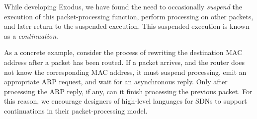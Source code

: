 While developing Exodus, we have found the need to occasionally \emph{suspend}
the execution of this packet-processing function, perform processing on other packets,
and later return to the suspended execution. This suspended execution is known as
a \emph{continuation}.

As a concrete example, consider the process of rewriting the destination MAC address
after a packet has been routed. If a packet arrives, and the router does not know the
corresponding MAC address, it must suspend processing, emit an appropriate ARP
request, and wait for an asynchronous reply. Only after processing the ARP reply, if
any, can it finish processing the previous packet. For this reason, we encourage
designers of high-level languages for SDNs to support continuations in their
packet-processing model.

%
%
% 
%
%
%

